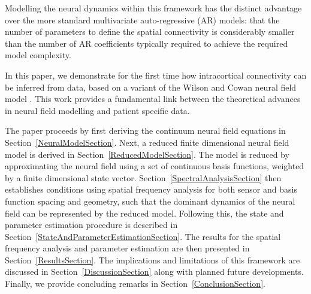\documentclass[12pt]{iopart}
\begin{document}
Modelling the neural dynamics within this framework has the distinct advantage over the more standard multivariate auto-regressive (AR) models: that the number of parameters to define the spatial connectivity is considerably smaller than the number of AR coefficients typically required to achieve the required model complexity. 

In this paper, we demonstrate for the first time how intracortical connectivity can be inferred from data, based on a variant of the Wilson and Cowan neural field model \cite{Wilson1973}. This work provides a fundamental link between the theoretical advances in neural field modelling and patient specific data.

The paper proceeds by first deriving the continuum neural field equations in Section~\ref{NeuralModelSection}. Next, a reduced finite dimensional neural field model is derived in Section~\ref{ReducedModelSection}. The model is reduced by approximating the neural field using a set of continuous basis functions, weighted by a finite dimensional state vector. Section~\ref{SpectralAnalysisSection} then establishes conditions using spatial frequency analysis for both sensor and basis function spacing and geometry, such that the dominant dynamics of the neural field can be represented by the reduced model. Following this, the state and parameter estimation procedure is described in Section~\ref{StateAndParameterEstimationSection}. The results for the spatial frequency analysis and parameter estimation are then presented in Section~\ref{ResultsSection}. The implications and limitations of this framework are discussed in Section~\ref{DiscussionSection} along with planned future developments. Finally, we provide concluding remarks in Section~\ref{ConclusionSection}.
\end{document}
